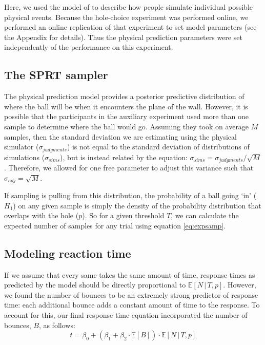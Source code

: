 \documentclass[10pt,letterpaper]{article}
\begin{document}
Here, we used the model of  to describe how people simulate individual possible physical events.
Because the hole-choice experiment was performed online, we performed an online replication of that experiment to set model parameters (see the Appendix for details).
Thus the physical prediction parameters were set independently of the performance on this experiment.

\subsection{The SPRT sampler}

The physical prediction model provides a posterior predictive distribution of where the ball will be when it encounters the plane of the wall.
However, it is possible that the participants in the auxiliary experiment used more than one sample to determine where the ball would go.
Assuming they took on average $M$ samples, then the standard deviation we are estimating using the physical simulator ($\sigma_{judgments}$) is not equal to the standard deviation of distributions of simulations ($\sigma_{sims}$), but is instead related by the equation: $\sigma_{sims} = \sigma_{judgments} / \sqrt{M}$.
Therefore, we allowed for one free parameter to adjust this variance such that $\sigma_{adj}=\sqrt{M}$.

If sampling is pulling from this distribution, the probability of a ball going `in' ($H_1$) on any given sample is simply the density of the probability distribution that overlaps with the hole ($p$).
So for a given threshold $T$, we can calculate the expected number of samples for any trial using equation \ref{eq:expsamp}.

\subsection{Modeling reaction time}

If we assume that every same takes the same amount of time, response times as predicted by the model should be directly proportional to $\mathbb{E}[N\,|\,T,p]$.
However, we found the number of bounces to be an extremely strong predictor of response time: each additional bounce adds a constant amount of time to the response.
To account for this, our final response time equation incorporated the number of bounces, $B$, as follows:
\begin{equation}
t = \beta_0 + (\beta_1 + \beta_2\cdot{}\mathbb{E}[B]) \cdot{}\mathbb{E}[N\,|\,T,p]
\label{eq:rt}
\end{equation}
\end{document}
